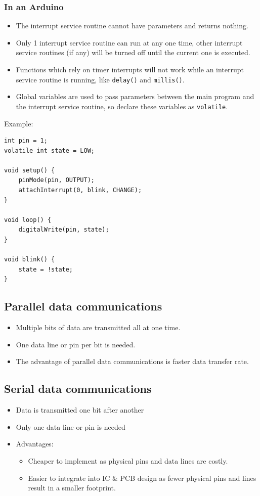 \documentclass[11pt]{article}
\begin{document}
 \newpage

\subsubsection{In an Arduino}
\label{sec:orga97fee6}
\begin{itemize}
\item The interrupt service routine cannot have parameters and returns nothing.
\item Only 1 interrupt service routine can run at any one time, other interrupt service routines (if any) will be turned off until the current one is executed.
\item Functions which rely on timer interrupts will not work while an interrupt service routine is running, like \texttt{delay()} and \texttt{millis()}.
\item Global variables are used to pass parameters between the main program and the interrupt service routine, so declare these variables as \texttt{volatile}.
\end{itemize}

Example:
\begin{verbatim}
int pin = 1;
volatile int state = LOW;

void setup() {
    pinMode(pin, OUTPUT);
    attachInterrupt(0, blink, CHANGE);
}

void loop() {
    digitalWrite(pin, state);
}

void blink() {
    state = !state;
}
\end{verbatim}

\subsection{Parallel data communications}
\label{sec:org2fa0943}
\begin{itemize}
\item Multiple bits of data are transmitted all at one time.
\item One data line or pin per bit is needed.
\item The advantage of parallel data communications is faster data transfer rate.
\end{itemize}

\subsection{Serial data communications}
\label{sec:org8b5e689}
\begin{itemize}
\item Data is transmitted one bit after another
\item Only one data line or pin is needed
\item Advantages:
\begin{itemize}
\item Cheaper to implement as physical pins and data lines are costly.
\item Easier to integrate into IC \& PCB design as fewer physical pins and lines result in a smaller footprint.
\end{itemize}
\end{itemize}
\end{document}
